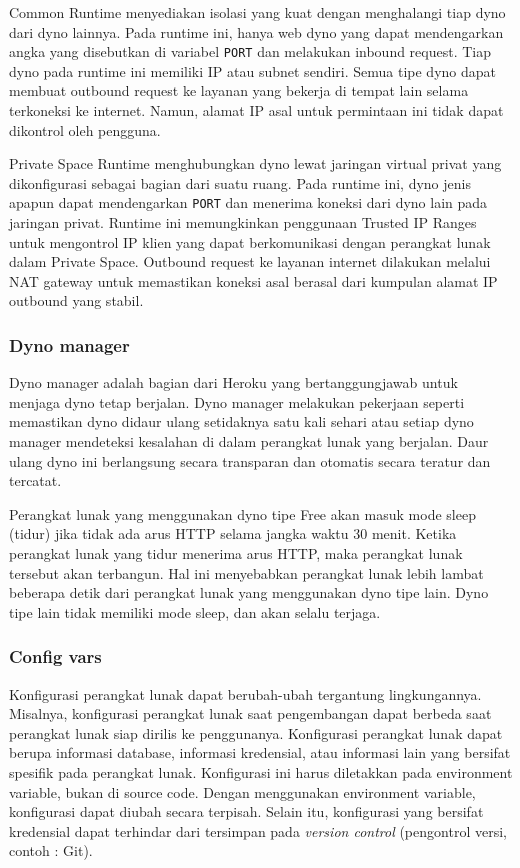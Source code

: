 Common Runtime menyediakan isolasi yang kuat dengan menghalangi tiap dyno dari dyno lainnya. Pada runtime ini, hanya web dyno yang dapat mendengarkan angka yang disebutkan di variabel \texttt{\textdollar PORT} dan melakukan inbound request. Tiap dyno pada runtime ini memiliki IP atau subnet sendiri. Semua tipe dyno dapat membuat outbound request ke layanan yang bekerja di tempat lain selama terkoneksi ke internet. Namun, alamat IP asal untuk permintaan ini tidak dapat dikontrol oleh pengguna.

Private Space Runtime menghubungkan dyno lewat jaringan virtual privat yang dikonfigurasi sebagai bagian dari suatu ruang. Pada runtime ini, dyno jenis apapun dapat mendengarkan \texttt{\textdollar PORT} dan menerima koneksi dari dyno lain pada jaringan privat. Runtime ini memungkinkan penggunaan Trusted IP Ranges untuk mengontrol IP klien yang dapat berkomunikasi dengan perangkat lunak dalam Private Space. Outbound request ke layanan internet dilakukan melalui NAT gateway untuk memastikan koneksi asal berasal dari kumpulan alamat IP outbound yang stabil.

\subsubsection{Dyno manager}
Dyno manager adalah bagian dari Heroku yang bertanggungjawab untuk menjaga dyno tetap berjalan. Dyno manager melakukan pekerjaan seperti memastikan dyno didaur ulang setidaknya satu kali sehari atau setiap dyno manager mendeteksi kesalahan di dalam perangkat lunak yang berjalan. Daur ulang dyno ini berlangsung secara transparan dan otomatis secara teratur dan tercatat.

Perangkat lunak yang menggunakan dyno tipe Free akan masuk mode sleep (tidur) jika tidak ada arus HTTP selama jangka waktu 30 menit. Ketika perangkat lunak yang tidur menerima arus HTTP, maka perangkat lunak tersebut akan terbangun. Hal ini menyebabkan perangkat lunak lebih lambat beberapa detik dari perangkat lunak yang menggunakan dyno tipe lain. Dyno tipe lain tidak memiliki mode sleep, dan akan selalu terjaga.

\subsubsection{Config vars}
Konfigurasi perangkat lunak dapat berubah-ubah tergantung lingkungannya. Misalnya, konfigurasi perangkat lunak saat pengembangan dapat berbeda saat perangkat lunak siap dirilis ke penggunanya. Konfigurasi perangkat lunak dapat berupa informasi database, informasi kredensial, atau informasi lain yang bersifat spesifik pada perangkat lunak. Konfigurasi ini harus diletakkan pada environment variable, bukan di source code. Dengan menggunakan environment variable, konfigurasi dapat diubah secara terpisah. Selain itu, konfigurasi yang bersifat kredensial dapat terhindar dari tersimpan pada \textit{version control} (pengontrol versi, contoh : Git).

